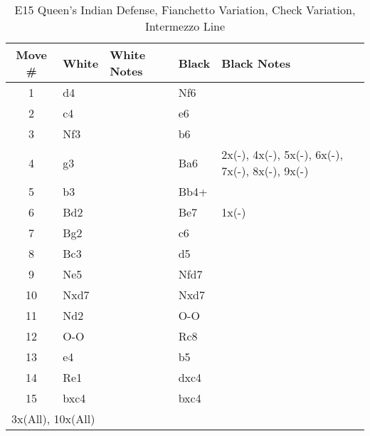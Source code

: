 \begin{table}[htbp]
\centering
\scriptsize
\caption{E15 Queen's Indian Defense, Fianchetto Variation, Check Variation, Intermezzo Line}
\begin{tabular}{|c|l|p{5cm}|l|p{5cm}|}
\hline
\textbf{Move \#} & \textbf{White} & \textbf{White Notes} & \textbf{Black} & \textbf{Black Notes} \\
\hline
1  & d4    &                     & Nf6    &                        \\
2  & c4    &                     & e6     &                        \\
3  & Nf3   &                     & b6     &                        \\
4  & g3    &                     & Ba6    & 2x(-), 4x(-), 5x(-), 6x(-), 7x(-), 8x(-), 9x(-) \\
5  & b3    &                     & Bb4+   &                        \\
6  & Bd2   &                     & Be7    & 1x(-)                  \\
7  & Bg2   &                     & c6     &                        \\
8  & Bc3   &                     & d5     &                        \\
9  & Ne5   &                     & Nfd7   &                        \\
10 & Nxd7  &                     & Nxd7   &                        \\
11 & Nd2   &                     & O-O    &                        \\
12 & O-O   &                     & Rc8    &                        \\
13 & e4    &                     & b5     &                        \\
14 & Re1   &                     & dxc4   &                        \\
15 & bxc4  &                     & bxc4   &                        \\
\hline
\multicolumn{5}{|l|}{3x(All), 10x(All)} \\
\hline
\end{tabular}
\end{table}


